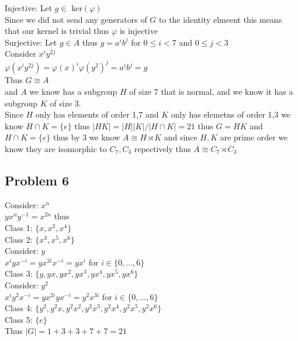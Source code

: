 \documentclass[12pt, letterpaper]{article}
\theoremstyle{definition}
\begin{document}
\begin{itemize}
    Injective: Let $g \in$ ker$(\varphi)$\\
    Since we did not send any generators of $G$ to the identity elmeent this means that our kernel is trivial thus $\varphi$ is injective\\
    Surjective: Let $g \in A$ thus $g=a^ib^j$ for $0 \leq i < 7$ and $0 \leq j < 3$\\
    Consider $x^iy^{2j}$\\
    $\varphi(x^iy^{2j})=\varphi(x)^i\varphi(y^2)^j=a^ib^j=g$\\
    Thus $G \cong A$\\
    and $A$ we know has a subgroup $H$ of size 7 that is normal, and we know it has a subgroup $K$ of size 3.\\
    Since $H$ only has elements of order 1,7 and $K$ only has elemetns of order 1,3 we know $H\cap K =\{e\}$ thus $|HK|=|H||K|/|H\cap K|=21$ thus $G=HK$ and $H \cap K = \{e\}$
    thus by 3 we know $A \cong H \rtimes K$ and since $H,K$ are prime order we know they are isomorphic to $C_7,C_3$ repectively thus $A \cong C_7 \rtimes C_3$
\end{itemize}

\newpage
\subsection*{Problem 6}
Consider: $x^n$\\
$yx^ny^{-1}=x^{2n}$ thus\\
Class 1: $\{x,x^2,x^4\}$\\
Class 2: $\{x^3,x^5,x^6\}$\\
Consider: $y$\\
$x^iyx^{-i}=yx^{2i}x^{-i}=yx^i$ for $i \in \{0,\dots,6\}$\\
Class 3: $\{y,yx,yx^2,yx^3,yx^4,yx^5,yx^6\}$\\
Consider: $y^2$\\
$x^iy^2x^{-i}=yx^{2i}yx^{-i}=y^2x^{3i}$ for $i \in \{0,\dots,6\}$\\
Class 4: $\{y^2,y^2x,y^2x^2,y^2x^3,y^2x^4,y^2x^5,y^2x^6\}$\\
Class 5: $\{e\}$\\
Thus $|G|=1+3+3+7+7=21$

\newpage
\end{document}

